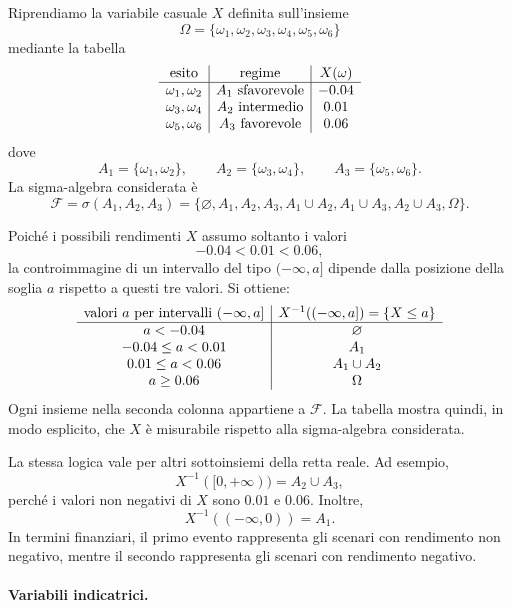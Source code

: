 \begin{example}
Riprendiamo la variabile
casuale $X$ definita sull'insieme
\[
\Omega=\{\omega_{1},\omega_{2},\omega_{3},\omega_{4},\omega_{5},\omega_{6}\}
\]
mediante la tabella
\[%
\begin{array}
[c]{c|c|c}%
\mbox{esito} & \mbox{regime} & X(\omega)\\\hline
\omega_{1},\omega_{2} & A_{1}\ \mbox{sfavorevole} & -0.04\\
\omega_{3},\omega_{4} & A_{2}\ \mbox{intermedio} & 0.01\\
\omega_{5},\omega_{6} & A_{3}\ \mbox{favorevole} & 0.06
\end{array}
\]
dove
\[
A_{1}=\{\omega_{1},\omega_{2}\}, \qquad A_{2}=\{\omega_{3},\omega_{4}\},
\qquad A_{3}=\{\omega_{5},\omega_{6}\}.
\]
La sigma-algebra considerata \`{e}
\[
\mathcal{F}=\sigma(A_{1},A_{2},A_{3}) = \{\varnothing, A_{1},A_{2},A_{3},
A_{1}\cup A_{2},A_{1}\cup A_{3},A_{2}\cup A_{3}, \Omega\}.
\]


Poich\'{e} i possibili rendimenti $X$ assumo soltanto i valori%
\[
-0.04<0.01<0.06,
\]
la controimmagine di un intervallo del tipo $(-\infty,a]$ dipende dalla
posizione della soglia $a$ rispetto a questi tre valori. Si ottiene:
\[%
\begin{array}
[c]{c|c}%
\text{valori }a\text{ per intervalli }(-\infty,a] & X^{-1}((-\infty
,a])=\{X\leq a\}\\\hline
a<-0.04 & \varnothing\\
-0.04\leq a<0.01 & A_{1}\\
0.01\leq a<0.06 & A_{1}\cup A_{2}\\
a\geq0.06 & \Omega
\end{array}
\]
Ogni insieme nella seconda colonna appartiene a $\mathcal{F}$. La tabella
mostra quindi, in modo esplicito, che $X$ \`{e} misurabile rispetto alla
sigma-algebra considerata.

La stessa logica vale per altri sottoinsiemi della retta reale. Ad esempio,
\[
X^{-1}([0,+\infty))=A_{2}\cup A_{3},
\]
perch\'{e} i valori non negativi di $X$ sono $0.01$ e $0.06$. Inoltre,
\[
X^{-1}((-\infty,0))=A_{1}.
\]
In termini finanziari, il primo evento rappresenta gli scenari con rendimento
non negativo, mentre il secondo rappresenta gli scenari con rendimento negativo.
\end{example}

\paragraph{Variabili indicatrici.}

